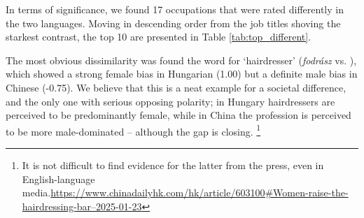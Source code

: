 \documentclass[11pt]{article}
\newcommand{\zh}[1]{\simplifiedchinesefont{#1}\rmfamily}
\begin{document}



In terms of significance, we found 17 occupations that were rated differently in the two languages. Moving in descending order from the job titles shoving the starkest contrast, the top 10 are presented in Table \ref{tab:top_different}.

The most obvious dissimilarity was found the word for `hairdresser' (\textit{fodrász} vs. \zh{理发师}), which showed a strong female bias in Hungarian (1.00) but a definite male bias in Chinese (-0.75). We believe that this is a neat example for a societal difference, and the only one with serious opposing polarity; in Hungary hairdressers are perceived to be predominantly female, while in China the profession is perceived to be more male-dominated -- although the gap is closing. \footnote{It is not difficult to find evidence for the latter from the press, even in English-language media.\href{https://www.chinadailyhk.com/hk/article/603100\#Women-raise-the-hairdressing-bar--2025-01-23}{https://www.chinadailyhk.com/hk/article/603100\#Women-raise-the-hairdressing-bar--2025-01-23}}
\end{document}
